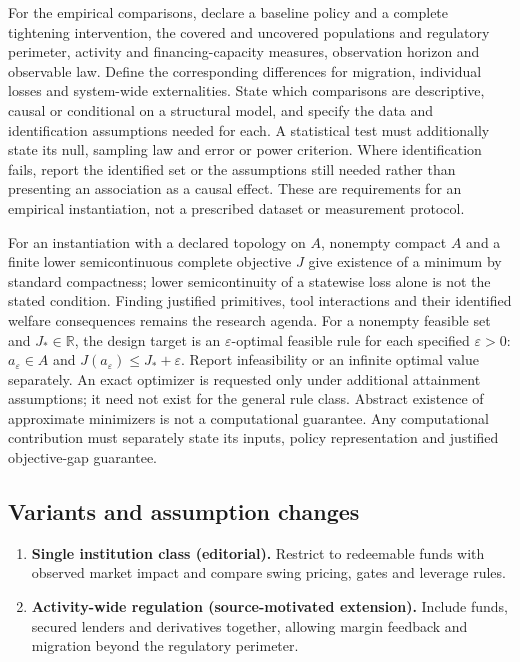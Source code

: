 \documentclass[11pt,a4paper]{article}
\newcommand{\R}{\mathbb R}
\begin{document}
For the empirical comparisons, declare a baseline policy and a complete tightening intervention, the covered and uncovered populations and regulatory perimeter, activity and financing-capacity measures, observation horizon and observable law. Define the corresponding differences for migration, individual losses and system-wide externalities. State which comparisons are descriptive, causal or conditional on a structural model, and specify the data and identification assumptions needed for each. A statistical test must additionally state its null, sampling law and error or power criterion. Where identification fails, report the identified set or the assumptions still needed rather than presenting an association as a causal effect. These are requirements for an empirical instantiation, not a prescribed dataset or measurement protocol.

For an instantiation with a declared topology on \(A\), nonempty compact \(A\) and a finite lower semicontinuous complete objective \(J\) give existence of a minimum by standard compactness; lower semicontinuity of a statewise loss alone is not the stated condition. Finding justified primitives, tool interactions and their identified welfare consequences remains the research agenda. For a nonempty feasible set and \(J_*\in\R\), the design target is an \(\varepsilon\)-optimal feasible rule for each specified \(\varepsilon>0\): \(a_\varepsilon\in A\) and \(J(a_\varepsilon)\leq J_*+\varepsilon\). Report infeasibility or an infinite optimal value separately. An exact optimizer is requested only under additional attainment assumptions; it need not exist for the general rule class. Abstract existence of approximate minimizers is not a computational guarantee. Any computational contribution must separately state its inputs, policy representation and justified objective-gap guarantee.
\subsection*{Variants and assumption changes}
\begin{enumerate}
\item \textbf{Single institution class (editorial).} Restrict to redeemable funds with observed market impact and compare swing pricing, gates and leverage rules.
\item \textbf{Activity-wide regulation (source-motivated extension).} Include funds, secured lenders and derivatives together, allowing margin feedback and migration beyond the regulatory perimeter.
\end{enumerate}
\end{document}

